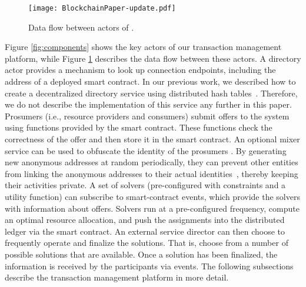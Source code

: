 \begin{figure}[t]
\centering
 \texttt{[image: BlockchainPaper-update.pdf]}
    \caption{Data flow between actors of \Platform. %
        }
    \label{fig:tmp}
\end{figure}


Figure \ref{fig:components} shows the key actors of our transaction management platform,
while
Figure \ref{fig:tmp} describes the data flow between these actors.
A directory actor provides a mechanism to look up connection endpoints, including the address of a deployed smart contract. In our previous work, we  described how to create a decentralized directory service using distributed hash tables~\cite{riaps1}. Therefore, we do not describe the implementation of this service any further in this paper. 
%
Prosumers (i.e., resource providers and consumers) submit offers to the system using functions provided by the smart contract. These functions check the correctness of the offer and then store it in the smart contract. An optional mixer service can be used to obfuscate the identity of the prosumers \cite{serial17}. By generating new anonymous addresses at random periodically, they can prevent other entities from linking the anonymous addresses to their actual identities~\cite{Laszka17,serial17}, thereby keeping their activities private. A set of solvers (pre-configured with constraints and a utility function) can subscribe to smart-contract events, which provide the solvers with information about offers. Solvers run at a pre-configured frequency, compute an optimal resource allocation, and push the assignments into the distributed ledger via the smart contract. An external service director can then choose to frequently operate and finalize the solutions. That is, choose from a number of possible solutions that are available. Once a solution has been finalized, the information is received by the participants via events. 
The following subsections describe the transaction management platform in more detail.
\iffalse
\ad{We need to reinforce the idea that ethereum is just an implementation choice and we believe that in future a proof of stake algorithm should be used for consensus. It does away with wasteful computation and creates a negative incentive for miners to cheat.}
\fi
